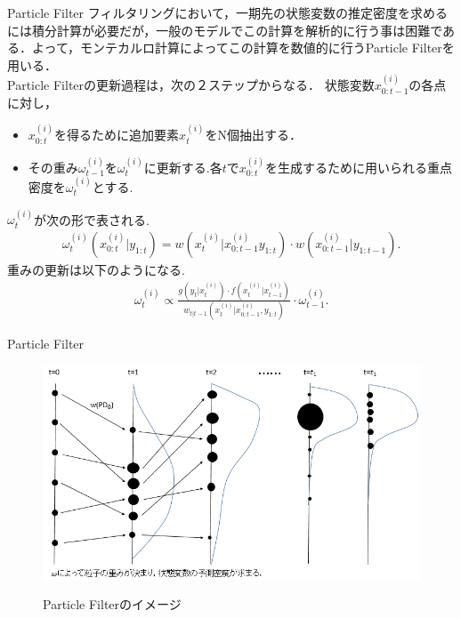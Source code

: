 \documentclass[dvipdfmx]{beamer}
\begin{document}
\begin{frame}{Particle Filter}
フィルタリングにおいて，一期先の状態変数の推定密度を求めるには積分計算が必要だが，一般のモデルでこの計算を解析的に行う事は困難である．よって，モンテカルロ計算によってこの計算を数値的に行うParticle Filterを用いる．\\
Particle Filterの更新過程は，次の２ステップからなる．
状態変数${x}^{(i)}_{0:t-1}$の各点に対し，
\begin{itemize}
\item ${x}^{(i)}_{0:t}$を得るために追加要素$x^{(i)}_t$をN個抽出する．
\item その重み$\omega_{t-1}^{(i)}$を$\omega_t^{(i)}$に更新する.各$t$で$x^{(i)}_{0:t}$を生成するために用いられる重点密度を$\omega^{(i)}_t$とする.\\
\end{itemize}
$\omega^{(i)}_t$が次の形で表される.
\begin{eqnarray*}
\omega^{(i)}_t(x^{(i)}_{0:t}|y_{1:t})=w(x^{(i)}_t|x^{(i)}_{0:t-1}y_{1:t})\cdot w(x^{(i)}_{0:t-1}|y_{1:t-1}).
\end{eqnarray*}
重みの更新は以下のようになる.
\begin{eqnarray*}
\omega^{(i)}_t\propto
\frac{g(y_t|x^{(i)}_t) \cdot f(x^{(i)}_t|x^{(i)}_{t-1})}{w_{t|t-1}(x^{(i)}_t|x^{(i)}_{0:t-1},y_{1:t})}\cdot \omega^{(i)}_{t-1}.
\end{eqnarray*}
\end{frame}

\begin{frame}{Particle Filter}
\begin{figure}[h]
\begin{center}
  \includegraphics[scale=0.6]{figure/粒子フィルタ2.png} \\
\caption{Particle Filterのイメージ}
\label{fig:状態空間モデルの遷移図}
\end{center}
\end{figure}
\end{frame}
\end{document}

